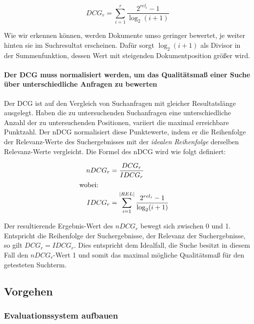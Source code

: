 \vspace{-1.5em}
\begin{equation}	
DCG_{r} = \sum\limits_{i=1}^r \frac{2^{rel_{i}} - 1}{\log_2(i+1)}
\end{equation}
\vspace{-1em}

Wie wir erkennen können, werden Dokumente umso geringer bewertet, je weiter hinten sie im Suchresultat erscheinen. Dafür sorgt $\log_2(i+1)$ als Divisor in der Summenfunktion, dessen Wert mit steigenden Dokumentposition größer wird.

\paragraph{Der DCG muss normalisiert werden, um das Qualitätsmaß einer Suche über unterschiedliche Anfragen zu bewerten}
Der DCG ist auf den Vergleich von Suchanfragen mit gleicher Resultatslänge ausgelegt. Haben die zu untersuchenden Suchanfragen eine unterschiedliche Anzahl der zu untersuchenden Positionen, variiert die maximal erreichbare Punktzahl. Der nDCG normalisiert diese Punktewerte, indem er die Reihenfolge der Relevanz-Werte des Suchergebnisses mit der \textit{idealen Reihenfolge} derselben Relevanz-Werte vergleicht. Die Formel des nDCG wird wie folgt definiert:

\vspace{-.25em}
\begin{spacing}{.25}
\begin{align}
  &&	nDCG_{r} &= \frac{DCG_r}{IDCG_r} &\\
  \intertext{wobei:}
  &&	IDCG_{r} 	&= \sum\limits_{i=1}^{\vert REL \vert} \frac{2^{rel_{i}} - 1}{\log_2(i+1)}
\end{align}
\end{spacing}
\vspace{.25em}

Der resultierende Ergebnis-Wert des $nDCG_r$ bewegt sich zwischen 0 und 1. Entspricht die Reihenfolge der Suchergebnisse, der Relevanz der Suchergebnisse, so gilt $DCG_r = IDCG_r$. Dies entspricht dem Idealfall, die Suche besitzt in diesem Fall den $nDCG_r$-Wert 1 und somit das maximal mögliche Qualitätsmaß für den getesteten Suchterm.

\subsection{Vorgehen}
\label{sec:Evaluation:Aufbau:Vorgehen}

\subsubsection{Evaluationssystem aufbauen}
\label{sec:Evaluation:Aufbau:Vorgehen:Aufbau}

